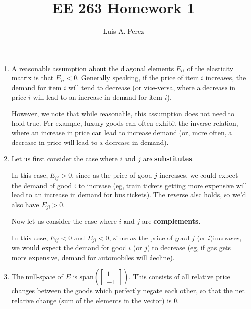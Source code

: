 \documentclass[12pt]{exam}
\newcommand*{\authorname}{Luis A. Perez}
\newcommand{\Q}[1]{\question{\large{\textbf{#1}}}}
\begin{document}
\title{EE 263 Homework 1}
\author{\authorname}
\date{}
\maketitle
\thispagestyle{headandfoot}
\setcounter{MaxMatrixCols}{15}

\begin{questions}
\Q{Price elasticity of demand}

\begin{solution}
  \begin{enumerate}[label=(\alph*)]
    \item A reasonable assumption about the diagonal elements $E_{ii}$ of the elasticity matrix is that $E_{ii} < 0$. Generally speaking, if the price of item $i$ increases, the demand for item $i$ will tend to decrease (or vice-versa, where a decrease in price $i$ will lead to an increase in demand for item $i$).

    However, we note that while reasonable, this assumption does not need to hold true. For example, luxury goods can often exhibit the inverse relation, where an increase in price can lead to increase demand (or, more often, a decrease in price will lead to a decrease in demand).

    \item Let us first consider the case where $i$ and $j$ are \textbf{substitutes}.

    In this case, $E_{ij} > 0$, since as the price of good $j$ increases, we could expect the demand of good $i$ to increase (eg, train tickets getting more expensive will lead to an increase in demand for bus tickets). The reverse also holds, so we'd also have $E_{ji} > 0$.

    Now let us consider the case where $i$ and $j$ are \textbf{complements}.

    In this case, $E_{ij} < 0$ and $E_{ji} < 0$, since as the price of good $j$ (or $i$)increases, we would expect the demand for good $i$ (or $j$) to decrease (eg, if gas gets more expensive, demand for automobiles will decline).

    \item The null-space of $E$ is $\text{span}\left(\begin{bmatrix}1 \\ -1 \end{bmatrix}\right)$. This consists of all relative price changes between the goods which perfectly negate each other, so that the net relative change (sum of the elements in the vector) is $0$.


\end{enumerate}
\end{solution}
\end{questions}
\end{document}
